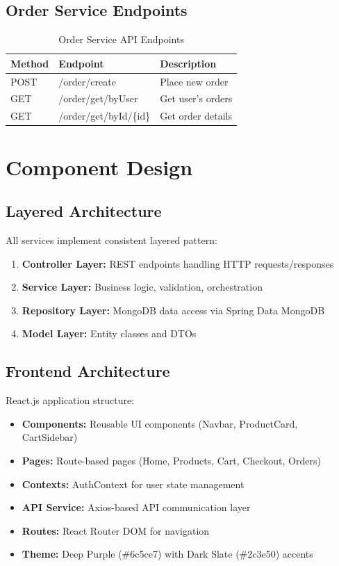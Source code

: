 \subsection{Order Service Endpoints}

\begin{table}[h!]
\centering
\caption{Order Service API Endpoints}
\begin{tabular}{|l|l|l|}
\hline
\textbf{Method} & \textbf{Endpoint} & \textbf{Description} \\
\hline
POST & /order/create & Place new order \\
GET & /order/get/byUser & Get user's orders \\
GET & /order/get/byId/\{id\} & Get order details \\
\hline
\end{tabular}
\end{table}

\section{Component Design}

\subsection{Layered Architecture}

All services implement consistent layered pattern:

\begin{enumerate}
    \item \textbf{Controller Layer:} REST endpoints handling HTTP requests/responses
    \item \textbf{Service Layer:} Business logic, validation, orchestration
    \item \textbf{Repository Layer:} MongoDB data access via Spring Data MongoDB
    \item \textbf{Model Layer:} Entity classes and DTOs
\end{enumerate}

\subsection{Frontend Architecture}

React.js application structure:
\begin{itemize}
    \item \textbf{Components:} Reusable UI components (Navbar, ProductCard, CartSidebar)
    \item \textbf{Pages:} Route-based pages (Home, Products, Cart, Checkout, Orders)
    \item \textbf{Contexts:} AuthContext for user state management
    \item \textbf{API Service:} Axios-based API communication layer
    \item \textbf{Routes:} React Router DOM for navigation
    \item \textbf{Theme:} Deep Purple (\#6c5ce7) with Dark Slate (\#2c3e50) accents
\end{itemize}

